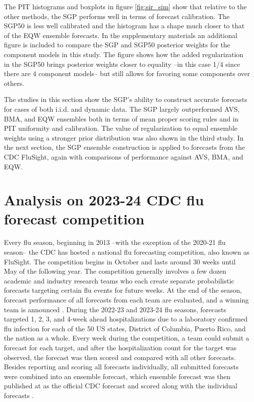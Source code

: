 The PIT histograms and boxplots in figure \ref{fig:sir_sim}
show that relative to the other methods, the SGP performs well in terms of 
forecast calibration. The SGP50 is less well calibrated and the histogram has a 
shape much closer to that of the EQW ensemble forecasts. In the supplementary 
materials an additional figure is included to compare the SGP and SGP50 
posterior weights for the component models in this study. The figure shows 
how the added regularization in the SGP50 brings posterior weights closer to
equality --in this case 1/4 since there are 4 component models-- but still 
allows for favoring some components over others.

The studies in this section show the SGP's ability to construct accurate 
forecasts for cases of both i.i.d. and dynamic data. The SGP largely 
outperformed AVS, 
BMA, and EQW ensembles both in terms of mean proper scoring rules and in PIT 
uniformity and calibration. 
The value of regularization to equal ensemble weights using a 
stronger prior distribution was also shown in the third study. 
In the next section, the SGP ensemble construction is applied 
to forecasts from the CDC FluSight, again with comparisons of 
performance against AVS, BMA, and EQW. 





\section{Analysis on 2023-24 CDC flu forecast competition} \label{sec:flu_analysis}

Every flu season, beginning in 2013 --with the exception of the 2020-21 flu 
season-- the CDC has hosted a national flu forecasting competition, also known 
as FluSight. The competition begins in October and lasts around 30 weeks until
May of the following year. The competition generally involves 
a few dozen academic and 
industry research teams who each create separate probabilistic forecasts 
targeting certain flu events for future weeks. At the end of the season, 
forecast performance of all forecasts from each team are evaluated, and a 
winning team is announced 
\cite[]{mathis2024evaluation,biggerstaff2016results}. During the 2022-23 
and 2023-24 flu seasons, forecasts targeted 1, 2, 3, and 4-week ahead 
hospitalizations due to a laboratory confirmed flu infection for each of the 
50 US states, District of Columbia, Puerto Rico, and the nation as a whole. 
Every week during the competition, a team could submit a forecast for each 
target, and after the hospitalization count for the target was observed, the 
forecast was then scored and compared with all other forecasts. Besides 
reporting and scoring all forecasts individually, all submitted forecasts 
were combined into an ensemble forecast, which ensemble forecast 
was then published at 
\cite{cdc2024previous} as the official CDC forecast and scored along 
with the individual forecasts 
\cite[]{mathis2024evaluation,wadsworth2023mixture}.  

